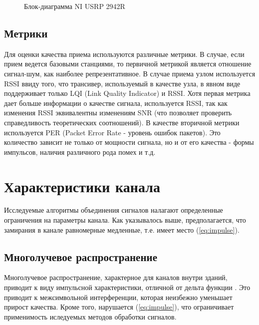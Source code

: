 \documentclass[a4paper,12pt,oneside]{scrartcl}
\begin{document}
\begin{figure}[h!]
\caption{Блок-диаграмма NI USRP 2942R}
\label{fig:USRPBD}
\end{figure}

\subsection{Метрики}
Для оценки качества приема используются различные метрики.
В случае, если прием ведется базовыми станциями, то первичной метрикой является отношение сигнал-шум, как наиболее репрезентативное.
В случае приема узлом используется RSSI ввиду того, что трансивер, используемый в качестве узла, в явном виде поддерживает только LQI (Link Quality Indicator) и RSSI. 
Хотя первая метрика дает больше информации о качестве сигнала, используется RSSI, так как изменения RSSI эквивалентны изменениям SNR (что позволяет проверить справедливость теоретических соотношений).
В качестве вторичной метрики используется PER (Packet Error Rate - уровень ошибок пакетов). Это количество зависит не только от мощности сигнала, но и от его качества - формы импульсов, наличия различного рода помех и т.д.
\clearpage

\section{Характеристики канала}
Исследуемые алгоритмы объединения сигналов налагают определенные ограничения на параметры канала. 
Как указывалось выше, предполагается, что замирания в канале равномерные медленные, т.е. имеет место (\ref{eq:impulse}). 
\subsection{Многолучевое распространение}
Многолучевое распространение, характерное для каналов внутри зданий, приводит к виду импульсной характеристики, отличной от дельта функции \cite{B2}. 
Это приводит к межсимвольной интерференции, которая неизбежно уменьшает прирост качества.
Кроме того, нарушается (\ref{eq:impulse}), что ограничивает применимость иследуемых методов обработки сигналов.
\end{document}
